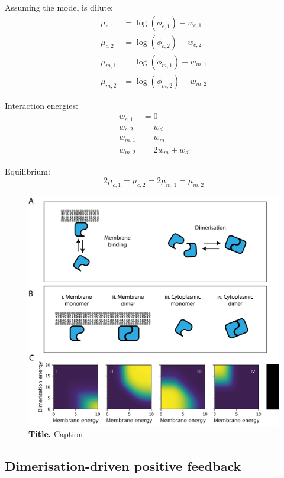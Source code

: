 \documentclass[12pt]{"article"}
\newcommand{\mycaption}[2]{\caption[#1]{\textbf{#1.} #2}}
\begin{document}
Assuming the model is dilute:
\begin{align}
\mu_{c,1} &= \log(\phi_{c,1}) - w_{c,1}\\
\mu_{c,2} &= \log(\phi_{c,2}) - w_{c,2}\\
\mu_{m,1} &= \log(\phi_{m,1}) - w_{m,1}\\
\mu_{m,2} &= \log(\phi_{m,2}) - w_{m,2}
\end{align}

Interaction energies:
\begin{align}
w_{c,1} &= 0\\
w_{c,2} &= w_d\\
w_{m,1} &= w_m\\
w_{m,2} &= 2w_m + w_d
\end{align}

Equilibrium:
\begin{equation}
2\mu_{c,1} = \mu_{c,2} = 2\mu_{m,1} = \mu_{m,2}
\end{equation}



\begin{figure}[!h]
\includegraphics[scale=0.9]{thermodynamic_model_species}
\setlength{\abovecaptionskip}{20pt}
\centering
\mycaption{Title}{Caption}
\end{figure}


\clearpage
\subsection{Dimerisation-driven positive feedback}
\end{document}
